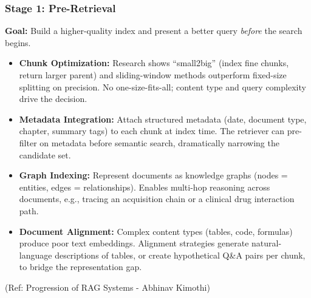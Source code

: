 \begin{frame}[fragile]\frametitle{Stage 1: Pre-Retrieval}

\textbf{Goal:} Build a higher-quality index and present a better query \textit{before} the search begins.

\begin{itemize}
  \item \textbf{Chunk Optimization:}
    Research shows ``small2big'' (index fine chunks, return larger parent) and sliding-window methods outperform fixed-size splitting on precision. No one-size-fits-all; content type and query complexity drive the decision.

  \item \textbf{Metadata Integration:}
    Attach structured metadata (date, document type, chapter, summary tags) to each chunk at index time. The retriever can pre-filter on metadata before semantic search, dramatically narrowing the candidate set.

  \item \textbf{Graph Indexing:}
    Represent documents as knowledge graphs (nodes = entities, edges = relationships). Enables multi-hop reasoning across documents, e.g., tracing an acquisition chain or a clinical drug interaction path.

  \item \textbf{Document Alignment:}
    Complex content types (tables, code, formulas) produce poor text embeddings. Alignment strategies generate natural-language descriptions of tables, or create hypothetical Q\&A pairs per chunk, to bridge the representation gap.
\end{itemize}

{\tiny (Ref: Progression of RAG Systems - Abhinav Kimothi)}

\end{frame}


